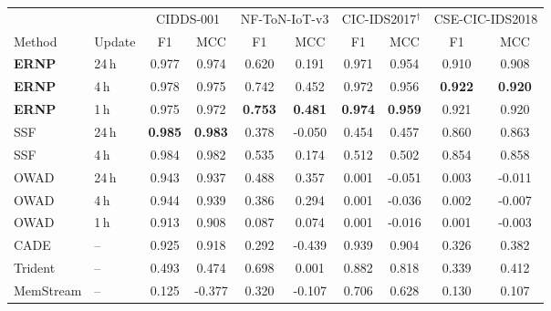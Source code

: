 \begin{tabular}{llcccccccc}
\toprule
 & & \multicolumn{2}{c}{CIDDS-001} & \multicolumn{2}{c}{NF-ToN-IoT-v3} & \multicolumn{2}{c}{CIC-IDS2017$^\dagger$} & \multicolumn{2}{c}{CSE-CIC-IDS2018}\\
\cmidrule(lr){3-4}\cmidrule(lr){5-6}\cmidrule(lr){7-8}\cmidrule(lr){9-10}
Method & Update & F1 & MCC & F1 & MCC & F1 & MCC & F1 & MCC\\
\midrule
\textbf{ERNP} & 24\,h & 0.977 & 0.974 & 0.620 & 0.191 & 0.971 & 0.954 & 0.910 & 0.908\\
\textbf{ERNP} & 4\,h & 0.978 & 0.975 & 0.742 & 0.452 & 0.972 & 0.956 & \textbf{0.922} & \textbf{0.920}\\
\textbf{ERNP} & 1\,h & 0.975 & 0.972 & \textbf{0.753} & \textbf{0.481} & \textbf{0.974} & \textbf{0.959} & 0.921 & 0.920\\
\midrule
SSF & 24\,h & \textbf{0.985} & \textbf{0.983} & 0.378 & -0.050 & 0.454 & 0.457 & 0.860 & 0.863\\
SSF & 4\,h & 0.984 & 0.982 & 0.535 & 0.174 & 0.512 & 0.502 & 0.854 & 0.858\\
OWAD & 24\,h & 0.943 & 0.937 & 0.488 & 0.357 & 0.001 & -0.051 & 0.003 & -0.011\\
OWAD & 4\,h & 0.944 & 0.939 & 0.386 & 0.294 & 0.001 & -0.036 & 0.002 & -0.007\\
OWAD & 1\,h & 0.913 & 0.908 & 0.087 & 0.074 & 0.001 & -0.016 & 0.001 & -0.003\\
\midrule
CADE & -- & 0.925 & 0.918 & 0.292 & -0.439 & 0.939 & 0.904 & 0.326 & 0.382\\
Trident & -- & 0.493 & 0.474 & 0.698 & 0.001 & 0.882 & 0.818 & 0.339 & 0.412\\
MemStream & -- & 0.125 & -0.377 & 0.320 & -0.107 & 0.706 & 0.628 & 0.130 & 0.107\\
\bottomrule
\end{tabular}
